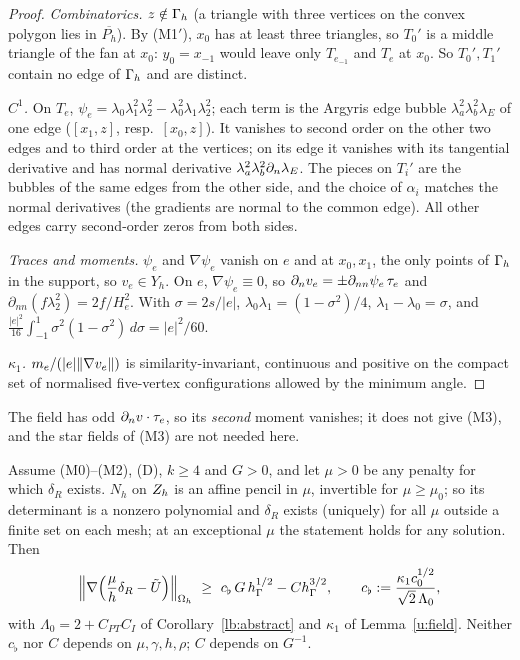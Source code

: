 \begin{proof}
\emph{Combinatorics.} $z\notin\Gamma_h$ (a triangle with three vertices on the convex polygon lies in $\overline{P_h}$). By (M1$'$), $x_0$ has at least three triangles, so $T_0'$ is a middle triangle of the fan at $x_0$: $y_0=x_{-1}$ would leave only $T_{e_{-1}}$ and $T_e$ at $x_0$. So $T_0',T_1'$ contain no edge of $\Gamma_h$ and are distinct.

\emph{$C^1$.} On $T_e$, $\psi_e=\lambda_0\lambda_1^2\lambda_2^2-\lambda_0^2\lambda_1\lambda_2^2$; each term is the Argyris edge bubble $\lambda_a^2\lambda_b^2\lambda_E$ of one edge ($[x_1,z]$, resp.\ $[x_0,z]$). It vanishes to second order on the other two edges and to third order at the vertices; on its edge it vanishes with its tangential derivative and has normal derivative $\lambda_a^2\lambda_b^2\partial_n\lambda_E$. The pieces on $T_i'$ are the bubbles of the same edges from the other side, and the choice of $\alpha_i$ matches the normal derivatives (the gradients are normal to the common edge). All other edges carry second-order zeros from both sides.

\emph{Traces and moments.} $\psi_e$ and $\nabla\psi_e$ vanish on $e$ and at $x_0,x_1$, the only points of $\Gamma_h$ in the support, so $v_e\in Y_h$. On $e$, $\nabla\psi_e\equiv0$, so $\partial_n v_e=\pm\partial_{nn}\psi_e\,\tau_e$ and $\partial_{nn}(f\lambda_2^2)=2f/H_e^2$. With $\sigma=2s/|e|$, $\lambda_0\lambda_1=(1-\sigma^2)/4$, $\lambda_1-\lambda_0=\sigma$, and $\frac{|e|^2}{16}\int_{-1}^1\sigma^2(1-\sigma^2)\,d\sigma=|e|^2/60$.

\emph{$\kappa_1$.} $m_e/(|e|\lVert \nabla v_e\rVert)$ is similarity-invariant, continuous and positive on the compact set of normalised five-vertex configurations allowed by the minimum angle.
\end{proof}

The field has odd $\partial_n v\cdot\tau_e$, so its \emph{second} moment vanishes; it does not give (M3), and the star fields of (M3) are not needed here.

\begin{theorem}\label{u:low}
Assume (M0)--(M2), (D), $k\ge4$ and $G>0$, and let $\mu>0$ be any penalty for which $\delta_R$ exists. $N_h$ on $Z_h$ is an affine pencil in $\mu$, invertible for $\mu\ge\mu_0$; so its determinant is a nonzero polynomial and $\delta_R$ exists (uniquely) for all $\mu$ outside a finite set on each mesh; at an exceptional $\mu$ the statement holds for any solution. Then
\[
\Bigl\|\nabla\Bigl(\frac\mu h\delta_R-\tilde U\Bigr)\Bigr\|_{\Omega_h}\ \ge\ c_\flat\,G\,h_\Gamma^{1/2}-Ch_\Gamma^{3/2},\qquad c_\flat:=\frac{\kappa_1c_0^{1/2}}{\sqrt2\,\Lambda_0},
\]
with $\Lambda_0=2+C_{PT}C_I$ of Corollary~\ref{lb:abstract} and $\kappa_1$ of Lemma~\ref{u:field}. Neither $c_\flat$ nor $C$ depends on $\mu,\gamma,h,\rho$; $C$ depends on $G^{-1}$.
\end{theorem}

